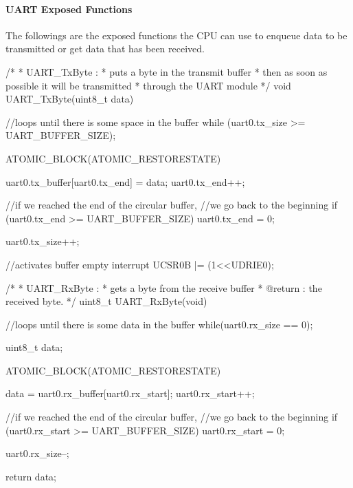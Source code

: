 \paragraph{UART Exposed Functions}
The followings are the exposed functions the CPU can use to enqueue data to be transmitted or get data that has been received.
\begin{ccode}
	/*
	 * UART_TxByte :
	 *  puts a byte in the transmit buffer
	 *		then as soon as possible it will be transmitted
	 *			through the UART module
	 */
	void UART_TxByte(uint8_t data) {
		//loops until there is some space in the buffer
		while (uart0.tx_size >= UART_BUFFER_SIZE);

		ATOMIC_BLOCK(ATOMIC_RESTORESTATE){
		  uart0.tx_buffer[uart0.tx_end] = data;
		  uart0.tx_end++;
		  
		  //if we reached the end of the circular buffer,
		  	//we go back to the beginning
			if (uart0.tx_end >= UART_BUFFER_SIZE)
				uart0.tx_end = 0;
		
			uart0.tx_size++;
		}
		
		//activates buffer empty interrupt
		UCSR0B |= (1<<UDRIE0);
	}

	/*
	 * UART_RxByte :
	 *  gets a byte from the receive buffer
	 *		@return : the received byte.
	 */
	uint8_t UART_RxByte(void) {
		//loops until there is some data in the buffer
		while(uart0.rx_size == 0);
	
		uint8_t data;
		
		ATOMIC_BLOCK(ATOMIC_RESTORESTATE){
		  data = uart0.rx_buffer[uart0.rx_start];
			uart0.rx_start++;
		
		  //if we reached the end of the circular buffer,
		  	//we go back to the beginning
			if (uart0.rx_start >= UART_BUFFER_SIZE)
				uart0.rx_start = 0;
		
			uart0.rx_size--;
		}
		
		return data;
	}
\end{ccode}

